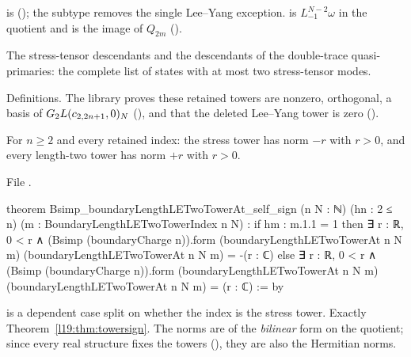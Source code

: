 \begin{dictionary}
 is 
(); the subtype removes the single Lee--Yang exception.
 is $L_{-1}^{N-2}\omega$ in the quotient and
 is the image of $Q_{2m}$ ().
\end{dictionary}

\begin{physics}
The stress-tensor descendants and the descendants of the double-trace quasi-primaries: the complete
list of states with at most two stress-tensor modes.
\end{physics}

\begin{status}
Definitions. The library proves these retained towers are nonzero, orthogonal, a basis of
$G_2L(c_{2,2n+1},0)_N$ (\allowbreak{}\allowbreak{}\allowbreak{}\allowbreak{}), and that the deleted Lee--Yang
tower is zero (\allowbreak{}\allowbreak{}\allowbreak{}).
\end{status}

\begin{theorem}\label{l19:thm:towersign}
For $n\ge2$ and every retained index: the stress tower has norm $-r$ with $r>0$, and every length-two
tower has norm $+r$ with $r>0$.
\end{theorem}

\noindent File .
\begin{leancode}
theorem Bsimp_boundaryLengthLETwoTowerAt_self_sign (n N : ℕ) (hn : 2 ≤ n)
    (m : BoundaryLengthLETwoTowerIndex n N) :
    if hm : m.1.1 = 1 then
      ∃ r : ℝ, 0 < r ∧
        (Bsimp (boundaryCharge n)).form (boundaryLengthLETwoTowerAt n N m)
          (boundaryLengthLETwoTowerAt n N m) = -(r : ℂ)
    else
      ∃ r : ℝ, 0 < r ∧
        (Bsimp (boundaryCharge n)).form (boundaryLengthLETwoTowerAt n N m)
          (boundaryLengthLETwoTowerAt n N m) = (r : ℂ) := by
\end{leancode}

\begin{dictionary}
 is a dependent case split on whether the index is the stress
tower. Exactly Theorem~\ref{l19:thm:towersign}. The norms are of the \emph{bilinear} form on the
quotient; since every real structure fixes the towers (\allowbreak{}), they are
also the Hermitian norms.
\end{dictionary}

